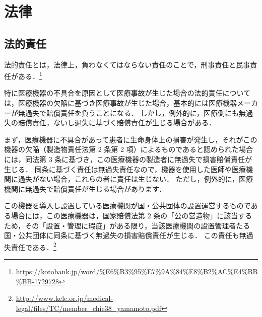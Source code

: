 \documentclass[uplatex,a4paper]{jsarticle}
\begin{document}
\section{法律}
\subsection{法的責任}
法的責任とは，法律上，負わなくてはならない責任のことで，刑事責任と民事責任がある．\footnote{\url{https://kotobank.jp/word/%E6%B3%95%E7%9A%84%E8%B2%AC%E4%BB%BB-1729728}}

特に医療機器の不具合を原因として医療事故が生じた場合の法的責任については，医療機器の欠陥に基づき医療事故が生じた場合，基本的には医療機器メーカーが無過失で賠償責任を負うことになる．
しかし，例外的に，医療側にも無過失の賠償責任，ないし過失に基づく賠償責任が生じる場合がある．

まず，医療機器に不具合があって患者に生命身体上の損害が発生し，それがこの機器の欠陥（製造物責任法第 2 条第 2 項）によるものであると認められた場合には，同法第 3 条に基づき，この医療機器の製造者に無過失で損害賠償責任が生じる．
同条に基づく責任は無過失責任なので，機器を使用した医師や医療機関に過失がない場合，これらの者に責任は生じない．
ただし，例外的に，医療機関に無過失で賠償責任が生じる場合があります．

この機器を導入し設置している医療機関が国・公共団体の設置運営するものである場合には，この医療機器は，国家賠償法第 2 条の「公の営造物」に該当するため，その「設置・管理に瑕疵」がある限り，当該医療機関の設置管理者たる国・公共団体に同条に基づく無過失の損害賠償責任が生じる．
この責任も無過失責任である．\footnote{\url{http://www.kclc.or.jp/medical-legal/files/TC/member_chie38_yamamoto.pdf}}
\end{document}
